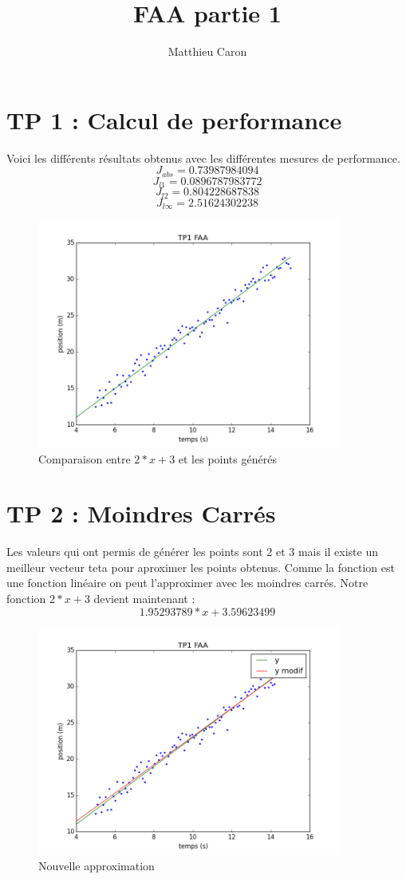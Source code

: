 \documentclass[a4paper,10pt]{report}
\title{FAA partie 1}
\author{Matthieu Caron}
\begin{document}
\maketitle

\section{TP 1 : Calcul de performance}

Voici les différents résultats obtenus avec les différentes mesures de performance.
$$J_{abs} = 0.73987984094 $$
$$J_{l1} = 0.0896787983772$$
$$J_{l2} = 0.804228687838$$
$$J_{l\infty} = 2.51624302238$$



\begin{figure}[H]
 \centering
 \caption{Comparaison entre $2*x + 3$ et les points générés}
 \includegraphics[width=10cm]{tp1.png}
\end{figure}

\section{TP 2 :  Moindres Carrés}
Les valeurs qui ont permis de générer les points sont 2 et 3 mais il existe un meilleur vecteur teta pour aproximer 
les points obtenus. Comme la fonction est une fonction linéaire on peut l'approximer avec les moindres carrés.
Notre fonction $2*x+3$ devient maintenant : $$1.95293789 * x + 3.59623499 $$

\begin{figure}[H]
 \centering
 \caption{Nouvelle approximation}
 \includegraphics[width=10cm]{tp2.png}
\end{figure}
\end{document}
